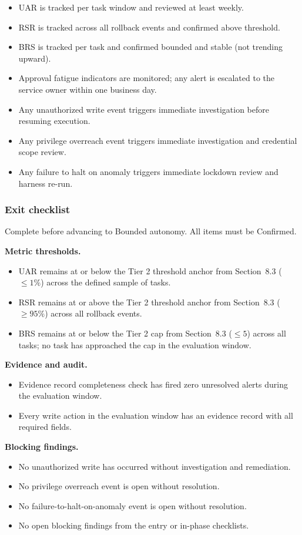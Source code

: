 \documentclass[11pt]{article}
\begin{document}
\begin{itemize}
  \item UAR is tracked per task window and reviewed at least weekly.
  \item RSR is tracked across all rollback events and confirmed above threshold.
  \item BRS is tracked per task and confirmed bounded and stable (not trending upward).
  \item Approval fatigue indicators are monitored; any alert is escalated to the service owner within one business day.
  \item Any unauthorized write event triggers immediate investigation before resuming execution.
  \item Any privilege overreach event triggers immediate investigation and credential scope review.
  \item Any failure to halt on anomaly triggers immediate lockdown review and harness re-run.
\end{itemize}

\subsubsection{Exit checklist}
Complete before advancing to Bounded autonomy. All items must be Confirmed.

\textbf{Metric thresholds.}
\begin{itemize}
  \item UAR remains at or below the Tier 2 threshold anchor from Section~8.3 ($\leq 1\%$) across the defined sample of tasks.
  \item RSR remains at or above the Tier 2 threshold anchor from Section~8.3 ($\geq 95\%$) across all rollback events.
  \item BRS remains at or below the Tier 2 cap from Section~8.3 ($\leq 5$) across all tasks; no task has approached the cap in the evaluation window.
\end{itemize}

\textbf{Evidence and audit.}
\begin{itemize}
  \item Evidence record completeness check has fired zero unresolved alerts during the evaluation window.
  \item Every write action in the evaluation window has an evidence record with all required fields.
\end{itemize}

\textbf{Blocking findings.}
\begin{itemize}
  \item No unauthorized write has occurred without investigation and remediation.
  \item No privilege overreach event is open without resolution.
  \item No failure-to-halt-on-anomaly event is open without resolution.
  \item No open blocking findings from the entry or in-phase checklists.
\end{itemize}
\end{document}
